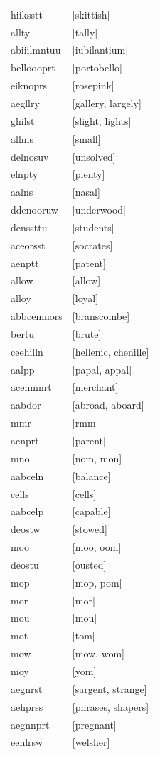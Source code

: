 \documentclass{article}
\begin{document}
\begin{tabular}{ll}
hiiksstt & [skittish] \\
allty & [tally] \\
abiiilmntuu & [iubilantium] \\
belloooprt & [portobello] \\
eiknoprs & [rosepink] \\
aegllry & [gallery, largely] \\
ghilst & [slight, lights] \\
allms & [small] \\
delnosuv & [unsolved] \\
elnpty & [plenty] \\
aalns & [nasal] \\
ddenooruw & [underwood] \\
denssttu & [students] \\
aceorsst & [socrates] \\
aenptt & [patent] \\
allow & [allow] \\
alloy & [loyal] \\
abbcemnors & [branscombe] \\
bertu & [brute] \\
ceehilln & [hellenic, chenille] \\
aalpp & [papal, appal] \\
acehmnrt & [merchant] \\
aabdor & [abroad, aboard] \\
mmr & [rmm] \\
aenprt & [parent] \\
mno & [nom, mon] \\
aabceln & [balance] \\
cells & [cells] \\
aabcelp & [capable] \\
deostw & [stowed] \\
moo & [moo, oom] \\
deostu & [ousted] \\
mop & [mop, pom] \\
mor & [mor] \\
mou & [mou] \\
mot & [tom] \\
mow & [mow, wom] \\
moy & [yom] \\
aegnrst & [sargent, strange] \\
aehprss & [phrases, shapers] \\
aegnnprt & [pregnant] \\
eehlrsw & [welsher] \\

\end{tabular}
\end{document}

